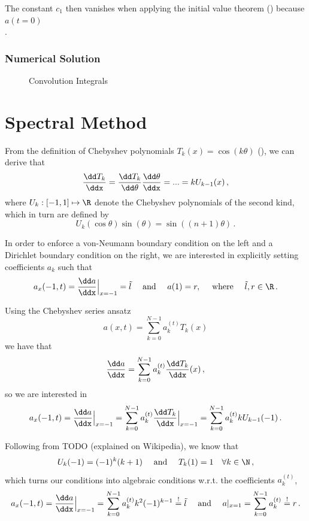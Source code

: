 \documentclass{prettytex/ox/mmsc-special-topic}
\begin{document}
  The constant $c_1$ then vanishes when applying the initial value theorem () because $a(t=0)$
  $$$$.

  \subsubsection{Numerical Solution}
  \begin{figure}[H]
    \centering
    \caption{Convolution Integrals}
    \label{fig:voltammetry-convolution}
  \end{figure}

  \section{Spectral Method}
  From the definition of Chebyshev polynomials $T_k(x) = \cos(k\theta)$ (), we can derive that
  $$\frac{\dd T_k}{\ddx} = \frac{\dd T_k}{\dd\theta} \frac{\dd\theta}{\ddx} = ... = k U_{k-1}(x)\,,$$
  where $U_k: [-1, 1] \mapsto \R$ denote the Chebyshev polynomials of the second kind, which in turn are defined by
  $$U_k(\cos \theta) \sin(\theta) = \sin\left((n+1) \theta\right)\,.$$

  In order to enforce a von-Neumann boundary condition on the left and a Dirichlet boundary condition on the right,
  we are interested in explicitly setting coefficients $a_k$ such that
  $$a_x(-1, t) = \frac{\dd a}{\ddx}\Big|_{x=-1} = \tilde{l} \quad \text{ and } \quad a(1) = r, \quad \text{ where } \quad \tilde{l}, r \in \R\,.$$

  Using the Chebyshev series ansatz
  $$a(x, t) = \sum_{k=0}^{N-1} a_k^{(t)} T_k(x)$$
  we have that
  $$\frac{\dd a}{\ddx} = \sum_{k=0}^{N-1} a_k^{(t)} \frac{\dd T_k}{\ddx}(x)\,,$$
  so we are interested in
  $$a_x(-1, t) = \frac{\dd a}{\ddx}\Big|_{x=-1} = \sum_{k=0}^{N-1} a_k^{(t)} \frac{\dd T_k}{\ddx}\Big|_{x=-1} = \sum_{k=0}^{N-1} a_k^{(t)} k U_{k-1}(-1)\,.$$

  Following from TODO (explained on Wikipedia), we know that
  $$U_k(-1) = (-1)^k (k+1) \quad \text{ and } \quad T_k(1) = 1 \quad \forall k \in \N\,,$$
  which turns our conditions into algebraic conditions w.r.t. the coefficients $a_k^{(t)}$,
  $$a_x(-1, t) = \frac{\dd a}{\ddx}\Big|_{x=-1} = \sum_{k=0}^{N-1} a_k^{(t)} k^2 (-1)^{k-1} \overset{!}{=} \tilde{l} \quad \text{ and } \quad a|_{x=1} = \sum_{k=0}^{N-1} a_k^{(t)} \overset{!}{=} r\,.$$
\end{document}
